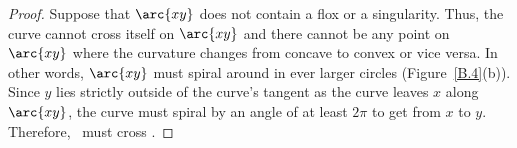 %
%
\begin{proof}
Suppose that $\arc{xy}$ does not contain a flox or a singularity.
Thus, the curve cannot cross itself on $\arc{xy}$ and there cannot be
any point on $\arc{xy}$ where the curvature changes from concave to
convex or vice versa.
In other words, $\arc{xy}$ must spiral around in ever larger 
circles (Figure~\ref{B.4}(b)).
Since $y$ lies strictly outside of the curve's tangent as the curve leaves
$x$ along $\arc{xy}$, the curve must spiral by an angle of at least $2\pi$ to 
get from $x$ to $y$.
Therefore, \  must cross .
\end{proof}
%
%
%
%
